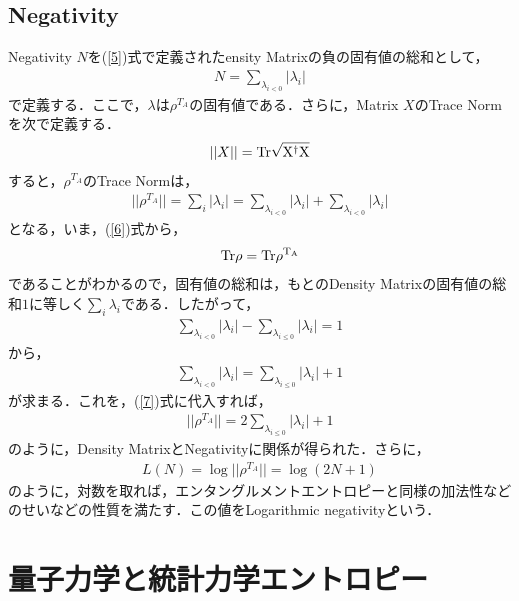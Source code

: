 \subsection{Negativity}
Negativity $N$を(\ref{5})式で定義されたensity Matrixの負の固有値の総和として，
\begin{eqnarray}
N=\sum_{\lambda_{i<0}}|\lambda_i|
\end{eqnarray}
で定義する．ここで，$\lambda$は$\rho^{T_{A}}$の固有値である．さらに，Matrix $X$のTrace Normを次で定義する．
\begin{eqnarray}
||X||=\rm{Tr}\sqrt{X^{\dagger}X}
\end{eqnarray}
すると，$\rho^{T_{A}}$のTrace Normは，
\begin{eqnarray}
\label{7}
||\rho^{T_{A}}||=\sum_{i}|\lambda_{i}|=\sum_{\lambda_{i<0}}|\lambda_i|+\sum_{\lambda_{i<0}}|\lambda_i|
\end{eqnarray}
となる，いま，(\ref{6})式から，
\begin{eqnarray}
\rm{Tr}\rho=\rm{Tr}\rho^{T_{A}}
\end{eqnarray}
であることがわかるので，固有値の総和は，もとのDensity Matrixの固有値の総和$1$に等しく$\sum_{i}\lambda_i$である．したがって，
\begin{eqnarray}
\sum_{\lambda_{i<0}}|\lambda_i|-\sum_{\lambda_{i\leqslant0}}|\lambda_i|=1
\end{eqnarray}
から，
\begin{eqnarray}
 \sum_{\lambda_{i<0}}|\lambda_i|=\sum_{\lambda_{i\leqslant0}}|\lambda_i|+1
\end{eqnarray}
が求まる．これを，(\ref{7})式に代入すれば，
\begin{eqnarray}
||\rho^{T_{A}}||=2\sum_{\lambda_{i\leqslant0}}|\lambda_i|+1
\end{eqnarray}
のように，Density MatrixとNegativityに関係が得られた．さらに，
\begin{eqnarray}
L(N)=\log||\rho^{T_{A}}||=\log(2N+1)
\end{eqnarray}
のように，対数を取れば，エンタングルメントエントロピーと同様の加法性などのせいなどの性質を満たす．この値をLogarithmic negativityという．
\section{量子力学と統計力学エントロピー}
